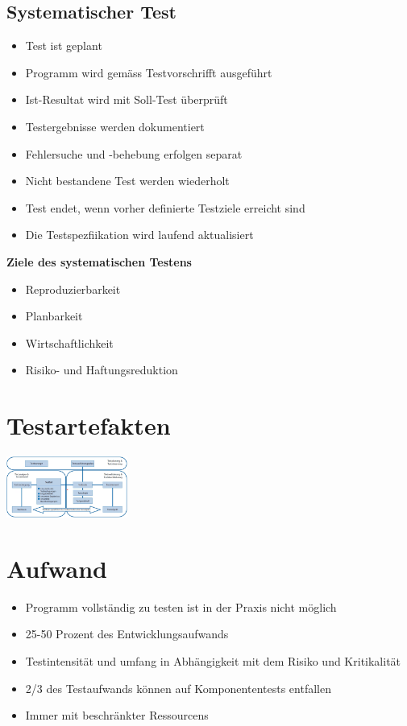 \documentclass{report}
\newenvironment{Figure}
	{\par\medskip\noindent\minipage{\linewidth}}
	{\endminipage\par\medskip}
\theoremstyle{definition}
\theoremstyle{example}
\begin{document}
\subsection{Systematischer Test}

\begin{itemize}
   \item Test ist geplant
   \item Programm wird gemäss Testvorschrifft ausgeführt
   \item Ist-Resultat wird mit Soll-Test überprüft
   \item Testergebnisse werden dokumentiert
   \item Fehlersuche und -behebung erfolgen separat
   \item Nicht bestandene Test werden wiederholt
   \item Test endet, wenn vorher definierte Testziele erreicht sind
   \item Die Testspezfiikation wird laufend aktualisiert
\end{itemize}


\textbf{Ziele des systematischen Testens}
\begin{itemize}
   \item Reproduzierbarkeit
   \item Planbarkeit
   \item Wirtschaftlichkeit
   \item Risiko- und Haftungsreduktion
\end{itemize}

\section{Testartefakten}
\begin{Figure}
   \centering
    \includegraphics[width=150px]{img/Testartefakte.png}
        \label{fig:Testartefakte}
\end{Figure}

\section{Aufwand}
\begin{itemize}
   \item Programm vollständig zu testen ist in der Praxis nicht möglich 
   \item 25-50 Prozent des Entwicklungsaufwands
   \item Testintensität und umfang in Abhängigkeit mit dem Risiko und Kritikalität
   \item 2/3 des Testaufwands können auf Komponententests entfallen
   \item Immer mit beschränkter Ressourcens
\end{itemize}
\end{document}
